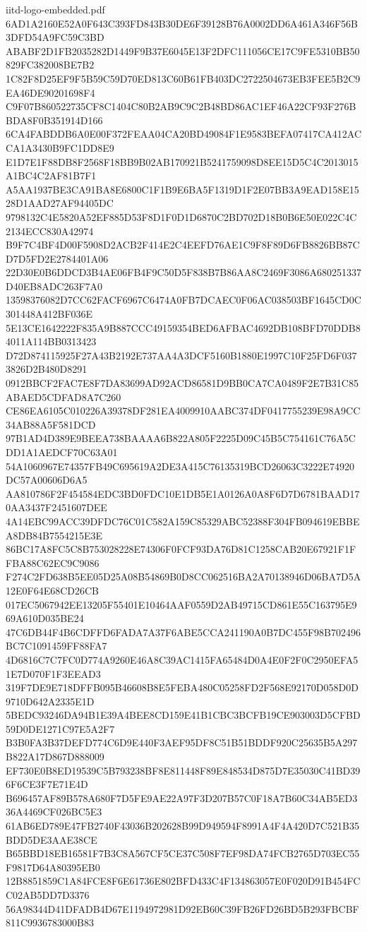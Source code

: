 \begin{filecontents*}[overwrite]{iitd-logo-embedded.pdf}
6AD1A2160E52A0F643C393FD843B30DE6F39128B76A0002DD6A461A346F56B3DFD54A9FC59C3BD
ABABF2D1FB2035282D1449F9B37E6045E13F2DFC111056CE17C9FE5310BB50829FC382008BE7B2
1C82F8D25EF9F5B59C59D70ED813C60B61FB403DC2722504673EB3FEE5B2C9EA46DE90201698F4
C9F07B860522735CF8C1404C80B2AB9C9C2B48BD86AC1EF46A22CF93F276BBDA8F0B351914D166
6CA4FABDDB6A0E00F372FEAA04CA20BD49084F1E9583BEFA07417CA412ACCA1A3430B9FC1DD8E9
E1D7E1F88DB8F2568F18BB9B02AB170921B5241759098D8EE15D5C4C2013015A1BC4C2AF81B7F1
A5AA1937BE3CA91BA8E6800C1F1B9E6BA5F1319D1F2E07BB3A9EAD158E1528D1AAD27AF94405DC
9798132C4E5820A52EF885D53F8D1F0D1D6870C2BD702D18B0B6E50E022C4C2134ECC830A42974
B9F7C4BF4D00F5908D2ACB2F414E2C4EEFD76AE1C9F8F89D6FB8826BB87CD7D5FD2E2784401A06
22D30E0B6DDCD3B4AE06FB4F9C50D5F838B7B86AA8C2469F3086A680251337D40EB8ADC263F7A0
13598376082D7CC62FACF6967C6474A0FB7DCAEC0F06AC038503BF1645CD0C301448A412BF036E
5E13CE1642222F835A9B887CCC49159354BED6AFBAC4692DB108BFD70DDB84011A114BB0313423
D72D874115925F27A43B2192E737AA4A3DCF5160B1880E1997C10F25FD6F0373826D2B480D8291
0912BBCF2FAC7E8F7DA83699AD92ACD86581D9BB0CA7CA0489F2E7B31C85ABAED5CDFAD8A7C260
CE86EA6105C010226A39378DF281EA4009910AABC374DF0417755239E98A9CC34AB88A5F581DCD
97B1AD4D389E9BEEA738BAAAA6B822A805F2225D09C45B5C754161C76A5CDD1A1AEDCF70C63A01
54A1060967E74357FB49C695619A2DE3A415C76135319BCD26063C3222E74920DC57A00606D6A5
AA810786F2F454584EDC3BD0FDC10E1DB5E1A0126A0A8F6D7D6781BAAD170AA3437F2451607DEE
4A14EBC99ACC39DFDC76C01C582A159C85329ABC52388F304FB094619EBBEA8DB84B7554215E3E
86BC17A8FC5C8B753028228E74306F0FCF93DA76D81C1258CAB20E67921F1FFBA88C62EC9C9086
F274C2FD638B5EE05D25A08B54869B0D8CC062516BA2A70138946D06BA7D5A12E0F64E68CD26CB
017EC5067942EE13205F55401E10464AAF0559D2AB49715CD861E55C163795E969A610D035BE24
47C6DB44F4B6CDFFD6FADA7A37F6ABE5CCA241190A0B7DC455F98B702496BC7C1091459FF88FA7
4D6816C7C7FC0D774A9260E46A8C39AC1415FA65484D0A4E0F2F0C2950EFA51E7D070F1F3EEAD3
319F7DE9E718DFFB095B46608B8E5FEBA480C05258FD2F568E92170D058D0D9710D642A2335E1D
5BEDC93246DA94B1E39A4BEE8CD159E41B1CBC3BCFB19CE903003D5CFBD59D0DE1271C97E5A2F7
B3B0FA3B37DEFD774C6D9E440F3AEF95DF8C51B51BDDF920C25635B5A297B822A17D867D888009
EF730E0B8ED19539C5B793238BF8E811448F89E848534D875D7E35030C41BD396F6CE3F7E71E4D
B696457AF89B578A680F7D5FE9AE22A97F3D207B57C0F18A7B60C34AB5ED336A4469CF026BC5E3
61AB6ED789E47FB2740F43036B202628B99D949594F8991A4F4A420D7C521B35BDD5DE3AAE38CE
B65BBD18EB16581F7B3C8A567CF5CE37C508F7EF98DA74FCB2765D703EC55F9817D64A80395EB0
12B8851859C1A84FCE8F6E61736E802BFD433C4F134863057E0F020D91B454FCC02AB5DD7D3376
56A98344D41DFADB4D67E1194972981D92EB60C39FB26FD26BD5B293FBCBF811C9936783000B83

\end{filecontents*}
